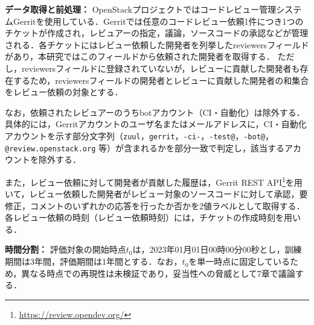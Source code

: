 \documentclass[submit,noauthor,ses,dvipdfmx]{ipsj}
\newcommand{\todo}[1]{\colorbox{yellow}{{\bf TODO}:}{\color{red} {\textbf{[#1]}}}}
\begin{document}
\noindent\textbf{データ取得と前処理：}
OpenStackプロジェクトではコードレビュー管理システムGerritを使用している．Gerritでは任意のコードレビュー依頼1件につき1つのチケットが作成され，レビュアーの指定，議論，ソースコードの承認などが管理される．各チケットにはレビュー依頼した開発者を列挙したreviewersフィールドがあり，本研究ではこのフィールドから依頼された開発者を取得する．
ただし，reviewersフィールドに登録されていないが，レビューに貢献した開発者も存在するため，reviewersフィールドの開発者とレビューに貢献した開発者の和集合をレビュー依頼の対象とする．

なお，依頼されたレビュアーのうちbotアカウント（CI・自動化）は除外する．具体的には，Gerritアカウントのユーザ名またはメールアドレスに，CI・自動化アカウントを示す部分文字列（\texttt{zuul}，\texttt{gerrit}，\texttt{-ci-}，\texttt{-test@}，\texttt{-bot@}，\texttt{@review.openstack.org} 等）が含まれるかを部分一致で判定し，該当するアカウントを除外する．

また，レビュー依頼に対して開発者が貢献した履歴は，Gerrit REST API\footnote{\url{https://review.opendev.org/}}を用いて，レビュー依頼した開発者がレビュー対象のソースコードに対して承認，要修正，コメントのいずれかの応答を行ったか否かを2値ラベルとして取得する．各レビュー依頼の時刻（レビュー依頼時刻）には，チケットの作成時刻を用いる．

\noindent\textbf{時間分割：}
評価対象の開始時点$t_0$は，2023年01月01日00時00分00秒とし，訓練期間は3年間，評価期間は1年間とする．なお，$t_0$を単一時点に固定しているため，異なる時点での再現性は未検証であり，妥当性への脅威として7章で議論する．
\end{document}
